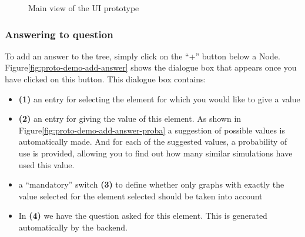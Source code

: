     \begin{figure}[h]
    \centering
    \caption{\label{fig:proto-demo}  Main view of the UI prototype}
    \end{figure}
    
    
    \subsubsection{Answering to question}
    To add an answer to the tree, simply click on the “+” button below a Node. Figure\ref{fig:proto-demo-add-answer} shows the dialogue box that appears once you have clicked on this button. This dialogue box contains:
    
    \begin{itemize}
        \item \textbf{(1)} an entry for selecting the element for which you would like to give a value
        \item \textbf{(2)} an entry for giving the value of this element. As shown in Figure\ref{fig:proto-demo-add-answer-proba} a suggestion of possible values is automatically made. And for each of the suggested values, a probability of use is provided, allowing you to find out how many similar simulations have used this value.
        \item a “mandatory” switch \textbf{(3)} to define whether only graphs with exactly the value selected for the element selected should be taken into account
        \item In \textbf{(4)} we have the question asked for this element. This is generated automatically by the backend.
    \end{itemize}
    

